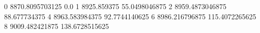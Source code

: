 0 8870.8095703125 0.0
1 8925.859375 55.0498046875
2 8959.4873046875 88.677734375
4 8963.583984375 92.7744140625
6 8986.216796875 115.4072265625
8 9009.482421875 138.6728515625
